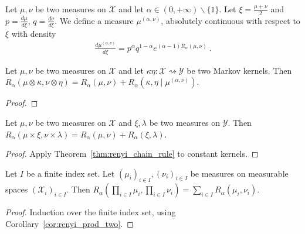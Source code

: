 \begin{definition}
  \label{def:renyi_measure}
  Let $\mu, \nu$ be two measures on $\mathcal X$ and let $\alpha \in (0, +\infty) \backslash \{1\}$. Let $\xi = \frac{\mu + \nu}{2}$ and $p = \frac{d \mu}{d \xi}$, $q = \frac{d \nu}{d \xi}$. We define a measure $\mu^{(\alpha, \nu)}$, absolutely continuous with respect to $\xi$ with density
  \begin{align*}
  \frac{d \mu^{(\alpha, \nu)}}{d \xi} = p^\alpha q^{1 - \alpha} e^{(\alpha - 1)R_\alpha(\mu, \nu)} \: .
  \end{align*}
\end{definition}

\begin{theorem}
  \label{thm:renyi_chain_rule}
  Let $\mu, \nu$ be two measures on $\mathcal X$ and let $\kappa \eta : \mathcal X \rightsquigarrow \mathcal Y$ be two Markov kernels.
  Then $R_\alpha(\mu \otimes \kappa, \nu \otimes \eta) = R_\alpha(\mu, \nu) + R_\alpha(\kappa, \eta \mid \mu^{(\alpha, \nu)})$.
\end{theorem}

\begin{proof}
\end{proof}

\begin{corollary}
  \label{cor:renyi_prod_two}
  Let $\mu, \nu$ be two measures on $\mathcal X$ and $\xi, \lambda$ be two measures on $\mathcal Y$.
  Then $R_\alpha(\mu \times \xi, \nu \times \lambda) = R_\alpha(\mu, \nu) + R_\alpha(\xi, \lambda)$.
\end{corollary}

\begin{proof}
Apply Theorem~\ref{thm:renyi_chain_rule} to constant kernels.
\end{proof}

\begin{theorem}
  \label{thm:renyi_prod}
  Let $I$ be a finite index set. Let $(\mu_i)_{i \in I}, (\nu_i)_{i \in I}$ be measures on measurable spaces $(\mathcal X_i)_{i \in I}$.
  Then $R_\alpha (\prod_{i \in I} \mu_i, \prod_{i \in I} \nu_i) = \sum_{i \in I} R_\alpha(\mu_i, \nu_i)$.
\end{theorem}

\begin{proof}
Induction over the finite index set, using Corollary~\ref{cor:renyi_prod_two}.
\end{proof}


